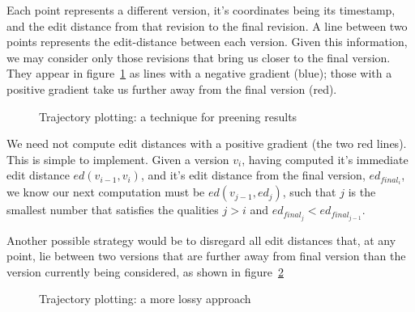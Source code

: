Each point represents a different version, it's coordinates being its
timestamp, and the edit distance from that revision to the final
revision. A line between two points represents the edit-distance
between each version. Given this information, we may consider only
those revisions that bring us closer to the final version. They appear
in figure~\ref{fig:traj-preen-1} as lines with a negative gradient
(blue); those with a positive gradient take us further away from the
final version (red).

\begin{figure}
  \centering
  \pgfplotsset{width=0.4\textwidth}
  \caption{Trajectory plotting: a technique for preening results}
  \label{fig:traj-preen-1}
\end{figure}

We need not compute edit distances with a positive gradient (the two
red lines). This is simple to implement. Given a version $v_i$, having
computed it's immediate edit distance $ed(v_{i-1},v_i)$, and it's edit
distance from the final version, $ed_{final_i}$, we know our next
computation must be $ed(v_{j-1},ed_j)$, such that $j$ is the smallest
number that satisfies the qualities $j > i$ and $ed_{final_j} <
ed_{final_{j-1}}$.

Another possible strategy would be to disregard all edit distances
that, at any point, lie between two versions that are further away
from final version than the version currently being considered, as
shown in figure~\ref{fig:traj-preen-2}

\begin{figure}
  \centering
  \pgfplotsset{width=0.4\textwidth}
  \caption{Trajectory plotting: a more lossy approach}
  \label{fig:traj-preen-2}
\end{figure}

